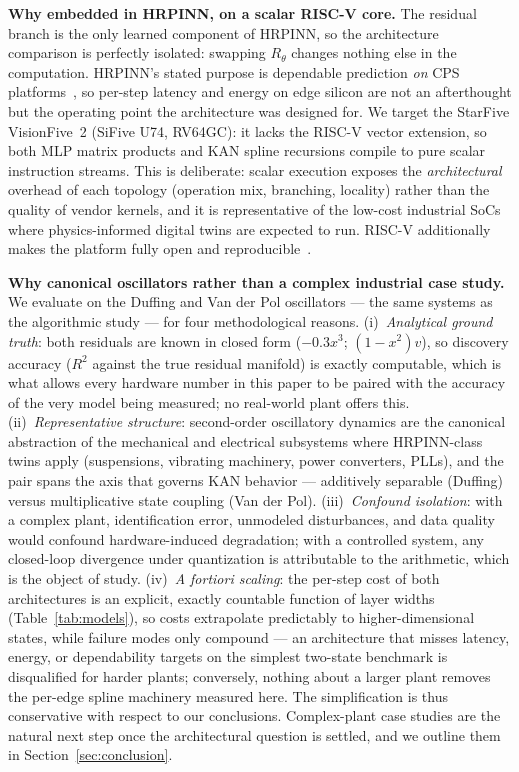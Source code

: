 \documentclass[conference]{IEEEtran}
\newcommand{\Rsq}{R^2}
\begin{document}
\textbf{Why embedded in HRPINN, on a scalar RISC-V core.} The residual branch
is the only learned component of HRPINN, so the architecture comparison is
perfectly isolated: swapping $R_\theta$ changes nothing else in the
computation. HRPINN's stated purpose is dependable prediction \emph{on} CPS
platforms~\cite{spotorno2025hard}, so per-step latency and energy on edge
silicon are not an afterthought but the operating point the architecture was
designed for. We target the StarFive VisionFive~2 (SiFive U74, RV64GC): it
lacks the RISC-V vector extension, so both MLP matrix products and KAN spline
recursions compile to pure scalar instruction streams. This is deliberate:
scalar execution exposes the \emph{architectural} overhead of each topology
(operation mix, branching, locality) rather than the quality of vendor
kernels, and it is representative of the low-cost industrial SoCs where
physics-informed digital twins are expected to run. RISC-V additionally makes
the platform fully open and reproducible~\cite{visionfive2}.

\textbf{Why canonical oscillators rather than a complex industrial case
study.} We evaluate on the Duffing and Van der Pol oscillators --- the same
systems as the algorithmic study --- for four methodological reasons.
(i)~\emph{Analytical ground truth}: both residuals are known in closed form
($-0.3x^3$; $(1-x^2)v$), so discovery accuracy ($\Rsq$ against the true
residual manifold) is exactly computable, which is what allows every hardware
number in this paper to be paired with the accuracy of the very model being
measured; no real-world plant offers this. (ii)~\emph{Representative
structure}: second-order oscillatory dynamics are the canonical abstraction of
the mechanical and electrical subsystems where HRPINN-class twins apply
(suspensions, vibrating machinery, power converters, PLLs), and the pair spans
the axis that governs KAN behavior --- additively separable (Duffing) versus
multiplicative state coupling (Van der Pol). (iii)~\emph{Confound isolation}:
with a complex plant, identification error, unmodeled disturbances, and data
quality would confound hardware-induced degradation; with a controlled system,
any closed-loop divergence under quantization is attributable to the
arithmetic, which is the object of study. (iv)~\emph{A fortiori scaling}: the
per-step cost of both architectures is an explicit, exactly countable function
of layer widths (Table~\ref{tab:models}), so costs extrapolate predictably to
higher-dimensional states, while failure modes only compound --- an
architecture that misses latency, energy, or dependability targets on the
simplest two-state benchmark is disqualified for harder plants; conversely,
nothing about a larger plant removes the per-edge spline machinery measured
here. The simplification is thus conservative with respect to our
conclusions. Complex-plant case studies are the natural next step once the
architectural question is settled, and we outline them in
Section~\ref{sec:conclusion}.
\end{document}
